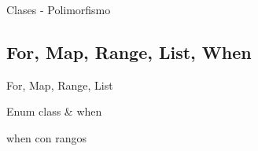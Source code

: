 			\begin{frame}[fragile]{Clases - Polimorfismo}	
				
			\end{frame}
			
	\subsection{For, Map, Range, List, When} %
	
		\begin{frame}[fragile]{For, Map, Range, List}	
			
		\end{frame}
		
		\begin{frame}[fragile]{Enum class \& when}	
			
		\end{frame}
		
		\begin{frame}[fragile]{when con rangos}	
			
		\end{frame}

